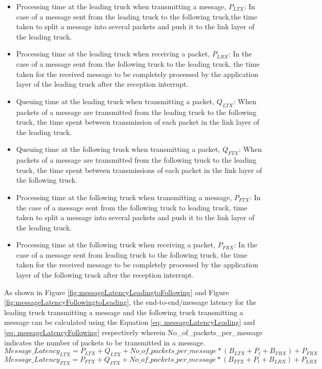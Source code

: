     \begin{itemize}
    \item Processing time at the leading truck when transmitting a message, \emph{$P_{LTX}$}: In case of a message sent from the leading truck to the following truck,the  time taken to split a message into several packets and push it to the link layer of the leading truck.
    
    \item Processing time at the leading truck when receiving a packet, \emph{$P_{LRX}$}: In the case of a message sent from the following truck to the leading truck, the time taken for the received message to be completely processed by the application layer of the leading truck after the reception interrupt.
    
    \item Queuing time at the leading truck when transmitting a packet, \emph{$Q_{LTX} $}: When packets of a message are transmitted from the leading truck to the following truck, the time spent between transmission of each packet in the link layer of the leading truck.
    
    \item Queuing time at the following truck when transmitting a packet, \emph{$Q_{FTX} $}: When packets of a message are transmitted from the following truck to the leading truck, the time spent between transmissions of each packet in the link layer of the following truck.
    
    \item Processing time at the following truck when transmitting a message, \emph{$P_{FTX}$}:
    In the case of a message sent from the following truck to leading truck, time taken to split a message into several packets and push it to the link layer of the leading truck.
    
    \item Processing time at the following truck when receiving a packet, \emph{$P_{FRX}$}: In the case of a message sent from leading truck to the following truck, the time taken for the received message to be completely processed by the application layer of the following truck after the reception interrupt.
\end{itemize}

As shown in Figure \ref{fig:messageLatencyLeadingtoFollowing} and Figure \ref{fig:messageLatencyFollowingtoLeading}, the end-to-end/message latency for the leading truck transmitting a message and the following truck transmitting a message can be calculated using the Equation \ref{eq: messageLatencyLeading} and \ref{eq: messageLatencyFollowing} respectively wherein No\_of\_packets\_per\_message indicates the number of packets to be transmitted in a message. 
\begin{equation}
Message\_Latency_{LTX} = P_{LTX} + Q_{LTX} + No\_of\_packets\_per\_message * (B_{LTX}  +  P_{t} +  B_{FRX}) + P_{FRX}
\label{eq: messageLatencyLeading}
\end{equation}
\begin{equation}
Message\_Latency_{FTX} = P_{FTX} + Q_{FTX} + No\_of\_packets\_per\_message * (B_{FTX}  +  P_{t} +  B_{LRX}) + P_{LRX}
\label{eq: messageLatencyFollowing}
\end{equation}

